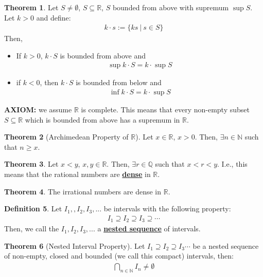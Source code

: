 \documentclass[reqno,11pt]{amsart}
\theoremstyle{definition}
\newtheorem{theorem}{Theorem}
\theoremstyle{definition}
\newtheorem{definition}[theorem]{Definition}
\theoremstyle{remark}
\newcommand{\R}{\mathbb{R}}
\newcommand{\dfn}[1]{\underline{\textbf{#1}}}
\begin{document}
\begin{theorem}
	Let $S \neq \emptyset$, $S \subseteq \R$, $S$ bounded from above with supremum $\sup{S}$. Let $k >0$ and define: 
	\begin{align*}
		k \cdot s := \{ ks\ |\ s \in S \} 
	\end{align*}
	Then, 
	\begin{itemize}[noitemsep]
		\item If $k > 0$, $k \cdot S$ is bounded from above and
		\begin{align}
			\sup{k \cdot S} = k \cdot \sup{S} 		
		\end{align}
		\item if $k < 0$, then $k \cdot S$ is bounded from below and 
		\begin{align}
			\inf{k \cdot S} = k \cdot \sup{S} 	
		\end{align}
	\end{itemize}
\end{theorem}

\textbf{AXIOM:} we assume $\R$ is complete. This means that every non-empty subset $S \subseteq \R$ which is bounded from above has a supremum in $\R$.
\begin{theorem}[Archimedean Property of $\R$]
	Let $x \in \R$, $x > 0$. Then, $\exists n \in \mathbb{N}$ such that $n \geq x$.
\end{theorem}

\begin{theorem}
	Let $x < y$, $x, y \in \R$. Then, $\exists r \in \mathbb{Q}$ such that $x < r < y$. I.e., this means that the rational numbers are \dfn{dense} in $\R$.
\end{theorem}

\begin{theorem}
	The irrational numbers are dense in $\R$.
\end{theorem}

\begin{definition}
	Let $I_1, , I_2, I_3,...$ be intervals with the following property:
	\begin{align*}
		I_1 \supseteq I_2 \supseteq I_3 \supseteq \cdots 
	\end{align*}
	Then, we call the $I_1, I_2, I_3,...$ a \dfn{nested sequence} of intervals.
\end{definition}


\begin{theorem}[Nested Interval Property]
	Let $I_1 \supseteq I_2 \supseteq I_3 \cdots$ be a nested sequence of non-empty, closed and bounded (we call this compact) intervals, then: 
	\begin{align}
		\bigcap_{n \in \mathbb{N}} I_n \neq \emptyset	
	\end{align}
\end{theorem}
\end{document}
